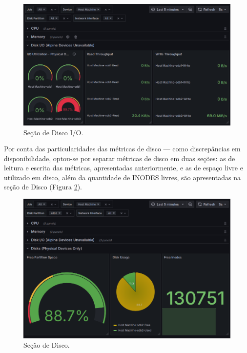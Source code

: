 \begin{figure}[H]
\centering
\setlength{\abovecaptionskip}{-20pt}
\includegraphics[width=\textwidth]{Imagens/chap04/dashboard/diskio.png}
\caption{Seção de Disco I/O.}
\label{fig:dashboard-diskio}
\end{figure}

Por conta das particularidades das métricas de disco --- como discrepâncias em disponibilidade, optou-se por separar métricas de disco em duas seções: as de leitura e escrita das métricas, apresentadas anteriormente, e as de espaço livre e utilizado em disco, além da quantidade de INODES livres, são apresentadas na seção de Disco (Figura \ref{fig:dashboard-disk}). 

\begin{figure}[H]
\centering
\setlength{\abovecaptionskip}{-20pt}
\includegraphics[width=\textwidth]{Imagens/chap04/dashboard/disk.png}
\caption{Seção de Disco.}
\label{fig:dashboard-disk}
\end{figure}

